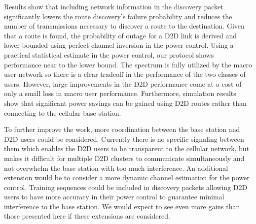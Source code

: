 \documentclass[10pt, final, journal, letterpaper,oneside, twocolumn]{IEEEtran}
\begin{document}
Results show that including network information in the discovery packet significantly lowers the route discovery's failure probability and reduces the number of transmissions necessary to discover a route to the destination.  Given that a route is found, the probability of outage for a D2D link is derived and lower bounded using perfect channel inversion in the power control.  Using a practical statistical estimate in the power control, our protocol shows performance near to the lower bound.  The spectrum is fully utilized by the macro user network so there is a clear tradeoff in the performance of the two classes of users.  However, large improvements in the D2D performance come at a cost of only a small loss in macro user performance.  Furthermore, simulation results show that significant power savings can be gained using D2D routes rather than connecting to the cellular base station.  

To further improve the work, more coordination between the base station and D2D users could be considered.  Currently there is no specific signaling between them which enables the D2D users to be transparent to the cellular network, but makes it difficult for multiple D2D clusters to communicate simultaneously and not overwhelm the base station with too much interference.  An additional extension would be to consider a more dynamic channel estimation for the power control.  Training sequences could be included in discovery packets allowing D2D users to have more accuracy in their power control to guarantee minimal interference to the base station.  We would expect to see even more gains than those presented here if these extensions are considered.  





































\ifCLASSOPTIONcaptionsoff
  \newpage
\fi









 

\end{document}
